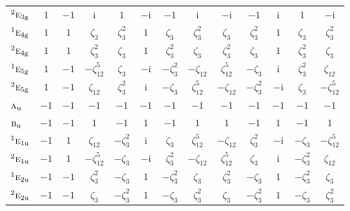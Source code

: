 \documentclass[10pt,a4paper]{article}
\numberwithin{equation}{section}
\newcommand{\irr}[1]{\text{\normalfont\scshape #1}}
\newcommand{\conjpair}[1]{{}^{#1}}
\newcommand{\ptag}[1]{\mathrm{#1}}
\newcommand{\iunit}{\mathrm{i}}
\newcommand{\rootunity}[1]{\zeta_{#1}}
\begin{document}
{\begin{longtable}{@{}lcccccccccccc@{}}
$\conjpair{2}\irr{e}_{3\ptag{g}}$ & $1$ & $-1$ & $\iunit{}$ & $1$ & $-\iunit{}$ & $-1$ & $\iunit{}$ & $-\iunit{}$ & $-1$ & $\iunit{}$ & $1$ & $-\iunit{}$\\
$\conjpair{1}\irr{e}_{4\ptag{g}}$ & $1$ & $1$ & $\rootunity{3}$ & $\rootunity{3}^{2}$ & $1$ & $\rootunity{3}$ & $\rootunity{3}^{2}$ & $\rootunity{3}$ & $\rootunity{3}^{2}$ & $1$ & $\rootunity{3}$ & $\rootunity{3}^{2}$\\
$\conjpair{2}\irr{e}_{4\ptag{g}}$ & $1$ & $1$ & $\rootunity{3}^{2}$ & $\rootunity{3}$ & $1$ & $\rootunity{3}^{2}$ & $\rootunity{3}$ & $\rootunity{3}^{2}$ & $\rootunity{3}$ & $1$ & $\rootunity{3}^{2}$ & $\rootunity{3}$\\
$\conjpair{1}\irr{e}_{5\ptag{g}}$ & $1$ & $-1$ & $-\rootunity{12}^{5}$ & $\rootunity{3}$ & $-\iunit{}$ & $-\rootunity{3}^{2}$ & $-\rootunity{12}$ & $\rootunity{12}^{5}$ & $-\rootunity{3}$ & $\iunit{}$ & $\rootunity{3}^{2}$ & $\rootunity{12}$\\
$\conjpair{2}\irr{e}_{5\ptag{g}}$ & $1$ & $-1$ & $\rootunity{12}$ & $\rootunity{3}^{2}$ & $\iunit{}$ & $-\rootunity{3}$ & $\rootunity{12}^{5}$ & $-\rootunity{12}$ & $-\rootunity{3}^{2}$ & $-\iunit{}$ & $\rootunity{3}$ & $-\rootunity{12}^{5}$\\
$\irr{a}_{\ptag{u}}$ & $-1$ & $-1$ & $-1$ & $-1$ & $-1$ & $-1$ & $-1$ & $-1$ & $-1$ & $-1$ & $-1$ & $-1$\\
$\irr{b}_{\ptag{u}}$ & $-1$ & $-1$ & $1$ & $-1$ & $1$ & $-1$ & $1$ & $1$ & $-1$ & $1$ & $-1$ & $1$\\
$\conjpair{1}\irr{e}_{1\ptag{u}}$ & $-1$ & $1$ & $\rootunity{12}$ & $-\rootunity{3}^{2}$ & $\iunit{}$ & $\rootunity{3}$ & $\rootunity{12}^{5}$ & $-\rootunity{12}$ & $\rootunity{3}^{2}$ & $-\iunit{}$ & $-\rootunity{3}$ & $-\rootunity{12}^{5}$\\
$\conjpair{2}\irr{e}_{1\ptag{u}}$ & $-1$ & $1$ & $-\rootunity{12}^{5}$ & $-\rootunity{3}$ & $-\iunit{}$ & $\rootunity{3}^{2}$ & $-\rootunity{12}$ & $\rootunity{12}^{5}$ & $\rootunity{3}$ & $\iunit{}$ & $-\rootunity{3}^{2}$ & $\rootunity{12}$\\
$\conjpair{1}\irr{e}_{2\ptag{u}}$ & $-1$ & $-1$ & $\rootunity{3}^{2}$ & $-\rootunity{3}$ & $1$ & $-\rootunity{3}^{2}$ & $\rootunity{3}$ & $\rootunity{3}^{2}$ & $-\rootunity{3}$ & $1$ & $-\rootunity{3}^{2}$ & $\rootunity{3}$\\
$\conjpair{2}\irr{e}_{2\ptag{u}}$ & $-1$ & $-1$ & $\rootunity{3}$ & $-\rootunity{3}^{2}$ & $1$ & $-\rootunity{3}$ & $\rootunity{3}^{2}$ & $\rootunity{3}$ & $-\rootunity{3}^{2}$ & $1$ & $-\rootunity{3}$ & $\rootunity{3}^{2}$\\

\end{longtable}}
\end{document}
